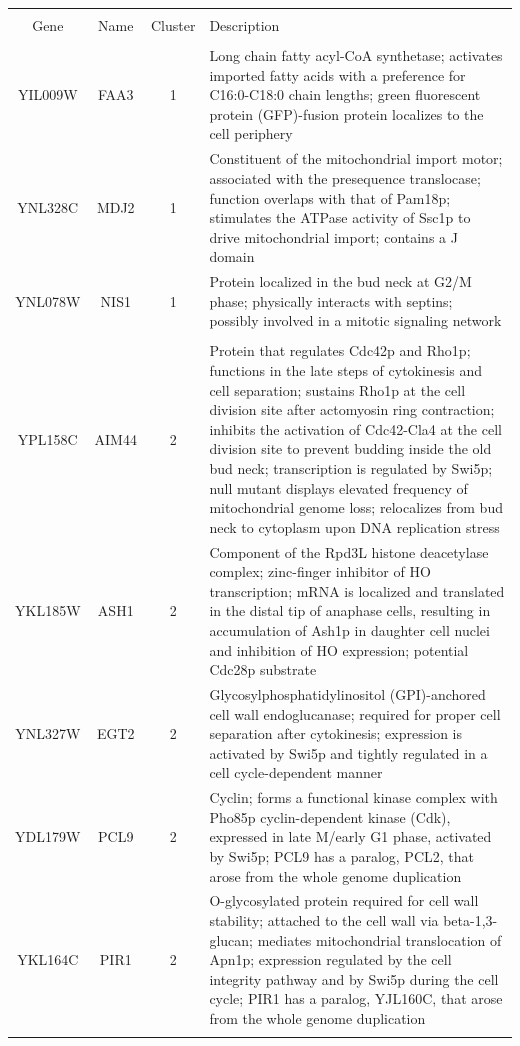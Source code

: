 \documentclass[]{article}
\begin{document}
	\begin{longtable}{@{\extracolsep{3pt}} cccp{85mm}} 
	\\[-1.8ex]\hline 
	\hline \\[-1.8ex] 
Gene & Name & Cluster & Description \\ 
\hline \\[-1.8ex] 
YIL009W & FAA3 & 1 & Long chain fatty acyl-CoA synthetase; activates imported fatty acids with a preference for C16:0-C18:0 chain lengths; green fluorescent protein (GFP)-fusion protein localizes to the cell periphery \\ 
YNL328C & MDJ2 & 1 & Constituent of the mitochondrial import motor; associated with the presequence translocase; function overlaps with that of Pam18p; stimulates the ATPase activity of Ssc1p to drive mitochondrial import; contains a J domain \\ 
YNL078W & NIS1 & 1 & Protein localized in the bud neck at G2/M phase; physically interacts with septins; possibly involved in a mitotic signaling network \\   \hline \\ [-1.8ex] 
YPL158C & AIM44 & 2 & Protein that regulates Cdc42p and Rho1p; functions in the late steps of cytokinesis and cell separation; sustains Rho1p at the cell division site after actomyosin ring contraction; inhibits the activation of Cdc42-Cla4 at the cell division site to prevent budding inside the old bud neck; transcription is regulated by Swi5p; null mutant displays elevated frequency of mitochondrial genome loss; relocalizes from bud neck to cytoplasm upon DNA replication stress \\ 
YKL185W & ASH1 & 2 & Component of the Rpd3L histone deacetylase complex; zinc-finger inhibitor of HO transcription; mRNA is localized and translated in the distal tip of anaphase cells, resulting in accumulation of Ash1p in daughter cell nuclei and inhibition of HO expression; potential Cdc28p substrate \\ 
YNL327W & EGT2 & 2 & Glycosylphosphatidylinositol (GPI)-anchored cell wall endoglucanase; required for proper cell separation after cytokinesis; expression is activated by Swi5p and tightly regulated in a cell cycle-dependent manner \\ 
YDL179W & PCL9 & 2 & Cyclin; forms a functional kinase complex with Pho85p cyclin-dependent kinase (Cdk), expressed in late M/early G1 phase, activated by Swi5p; PCL9 has a paralog, PCL2, that arose from the whole genome duplication \\ 
YKL164C & PIR1 & 2 & O-glycosylated protein required for cell wall stability; attached to the cell wall via beta-1,3-glucan; mediates mitochondrial translocation of Apn1p; expression regulated by the cell integrity pathway and by Swi5p during the cell cycle; PIR1 has a paralog, YJL160C, that arose from the whole genome duplication \\   \hline \\ [-1.8ex] 

\end{longtable}
\end{document}
